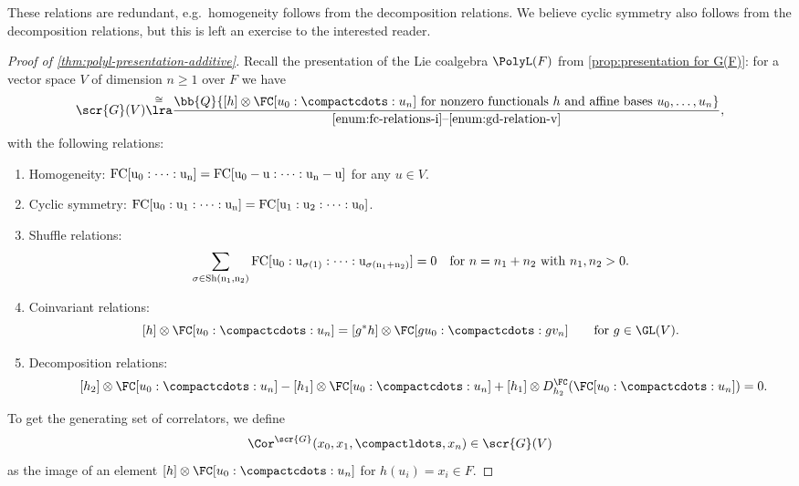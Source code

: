 \documentclass[a4paper]{amsart}
\begin{document}
\begin{remark}These relations are redundant, e.g.~homogeneity follows from the decomposition relations. We believe cyclic symmetry also follows from the decomposition relations, but this is left an exercise to the interested reader.
\end{remark}

\begin{proof}[Proof of \cref{thm:polyl-presentation-additive}]
Recall the presentation of the Lie coalgebra $\PolyL(F)$ from \cref{prop:presentation for G(F)}: for a vector space $V$  of dimension $n \geq 1$ over $F$ we have
\[
\scr{G}(V)\overset{\cong}{\lra} \frac{\bb{Q}\{[h] \otimes \FC[u_0:\compactcdots:u_n] \text{ for nonzero functionals $h$ and affine bases $u_0,\ldots,u_n$}\}}{\text{\eqref{enum:fc-relations-i}--\eqref{enum:gd-relation-v}}},
\]
with the following relations:
\begin{enumerate}[\noindent (1)] 
\item  Homogeneity: $\rm{FC}[u_0:\cdots:u_n] = \rm{FC}[u_0-u:\cdots:u_n-u]$ for any $u \in V$.
\item  Cyclic symmetry: $\rm{FC}[u_0:u_1:\cdots:u_n] = \rm{FC}[u_1:u_2:\cdots:u_0]$.
\item  Shuffle relations: 
\[\sum_{\sigma \in \rm{Sh}(n_1,n_2)} \rm{FC}[u_0:u_{\sigma(1)}:\cdots:u_{\sigma(n_1+n_2)}] =0 \quad \text{for $n=n_1+n_2$ with $n_1,n_2>0$.}\]
\item  Coinvariant relations:
\[[h] \otimes \FC[u_0:\compactcdots:u_n] = [g^*h] \otimes \FC[gu_0:\compactcdots:gv_n] \qquad \text{for $g \in \GL(V)$}.\]
\item Decomposition relations:
\[\qquad [h_2] \otimes \FC[u_0:\compactcdots:u_n]-[h_1] \otimes \FC[u_0:\compactcdots:u_n]+[h_1] \otimes D^\FC_{h_2}(\FC[u_0:\compactcdots:u_n])=0.\]
\end{enumerate}

To get the generating set of correlators, we define
\[\Cor^\scr{G}(x_0,x_1,\compactldots,x_n) \in \scr{G}(V)\] 
as the image of an element $[h] \otimes \FC[u_0:\compactcdots : u_n]$ for $h(u_i) = x_i \in F$. 


\end{proof}
\end{document}
